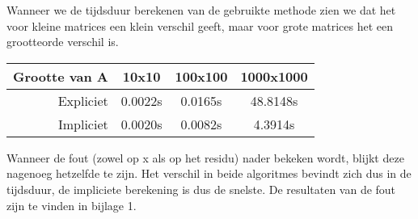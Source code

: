 Wanneer we de tijdsduur berekenen van de gebruikte methode zien we dat het voor kleine matrices een klein verschil geeft, maar voor grote matrices het een grootteorde verschil is.\\[12pt]

\centering
\begin{tabular}{|r|c|c|c|}
\hline
Grootte van A & 10x10 & 100x100 & 1000x1000\\ \hline
Expliciet & 0.0022s & 0.0165s & 48.8148s\\ \hline
Impliciet & 0.0020s & 0.0082s & 4.3914s\\ \hline
\end{tabular}
\centering
{}
\label{Tijd Householder}

\begin{flushleft}
Wanneer de fout (zowel op x als op het residu) nader bekeken wordt, blijkt deze nagenoeg hetzelfde te zijn. Het verschil in beide algoritmes bevindt zich dus in de tijdsduur, de impliciete berekening is dus de snelste. De resultaten van de fout zijn te vinden in bijlage 1.\\[12pt]
\end{flushleft}

